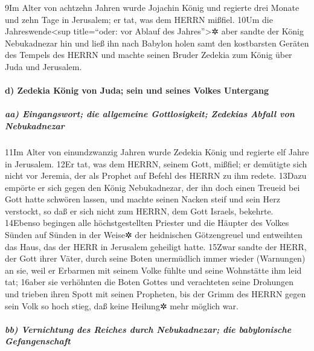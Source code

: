 9Im Alter von achtzehn Jahren wurde Jojachin König und regierte drei
Monate und zehn Tage in Jerusalem; er tat, was dem HERRN mißfiel. 10Um
die Jahreswende\textless sup title=``oder: vor Ablauf des
Jahres''\textgreater✲ aber sandte der König Nebukadnezar hin und ließ
ihn nach Babylon holen samt den kostbarsten Geräten des Tempels des
HERRN und machte seinen Bruder Zedekia zum König über Juda und
Jerusalem.

\hypertarget{d-zedekia-kuxf6nig-von-juda-sein-und-seines-volkes-untergang}{%
\paragraph{d) Zedekia König von Juda; sein und seines Volkes
Untergang}\label{d-zedekia-kuxf6nig-von-juda-sein-und-seines-volkes-untergang}}

\hypertarget{aa-eingangswort-die-allgemeine-gottlosigkeit-zedekias-abfall-von-nebukadnezar}{%
\subparagraph{aa) Eingangswort; die allgemeine Gottlosigkeit; Zedekias
Abfall von
Nebukadnezar}\label{aa-eingangswort-die-allgemeine-gottlosigkeit-zedekias-abfall-von-nebukadnezar}}

11Im Alter von einundzwanzig Jahren wurde Zedekia König und regierte elf
Jahre in Jerusalem. 12Er tat, was dem HERRN, seinem Gott, mißfiel; er
demütigte sich nicht vor Jeremia, der als Prophet auf Befehl des HERRN
zu ihm redete. 13Dazu empörte er sich gegen den König Nebukadnezar, der
ihn doch einen Treueid bei Gott hatte schwören lassen, und machte seinen
Nacken steif und sein Herz verstockt, so daß er sich nicht zum HERRN,
dem Gott Israels, bekehrte. 14Ebenso begingen alle höchstgestellten
Priester und die Häupter des Volkes Sünden auf Sünden in der Weise✲ der
heidnischen Götzengreuel und entweihten das Haus, das der HERR in
Jerusalem geheiligt hatte. 15Zwar sandte der HERR, der Gott ihrer Väter,
durch seine Boten unermüdlich immer wieder (Warnungen) an sie, weil er
Erbarmen mit seinem Volke fühlte und seine Wohnstätte ihm leid tat;
16aber sie verhöhnten die Boten Gottes und verachteten seine Drohungen
und trieben ihren Spott mit seinen Propheten, bis der Grimm des HERRN
gegen sein Volk so hoch stieg, daß keine Heilung✲ mehr möglich war.

\hypertarget{bb-vernichtung-des-reiches-durch-nebukadnezar-die-babylonische-gefangenschaft}{%
\subparagraph{bb) Vernichtung des Reiches durch Nebukadnezar; die
babylonische
Gefangenschaft}\label{bb-vernichtung-des-reiches-durch-nebukadnezar-die-babylonische-gefangenschaft}}

